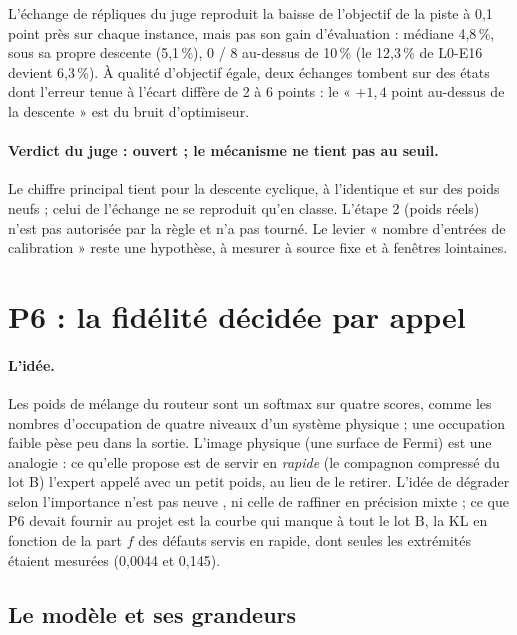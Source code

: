 L'échange de répliques du juge reproduit la baisse de l'objectif de la piste à 0,1 point près sur chaque instance, mais pas son gain d'évaluation : médiane 4,8\,\%, sous sa propre descente (5,1\,\%), 0 / 8 au-dessus de 10\,\% (le 12,3\,\% de L0-E16 devient 6,3\,\%). À qualité d'objectif égale, deux échanges tombent sur des états dont l'erreur tenue à l'écart diffère de 2 à 6 points : le « $+1{,}4$ point au-dessus de la descente » est du bruit d'optimiseur.

\paragraph{Verdict du juge : ouvert ; le mécanisme ne tient pas au seuil.} Le chiffre principal tient pour la descente cyclique, à l'identique et sur des poids neufs ; celui de l'échange ne se reproduit qu'en classe. L'étape 2 (poids réels) n'est pas autorisée par la règle et n'a pas tourné. Le levier « nombre d'entrées de calibration » reste une hypothèse, à mesurer à source fixe et à fenêtres lointaines.

\section{P6 : la fidélité décidée par appel}\label{t3mim:sec:p6}

\paragraph{L'idée.} Les poids de mélange du routeur sont un softmax sur quatre scores, comme les nombres d'occupation de quatre niveaux d'un système physique ; une occupation faible pèse peu dans la sortie. L'image physique (une surface de Fermi) est une analogie : ce qu'elle propose est de servir en \emph{rapide} (le compagnon compressé du lot B) l'expert appelé avec un petit poids, au lieu de le retirer. L'idée de dégrader selon l'importance n'est pas neuve \cite{hobbit2024,lu2024notallexperts}, ni celle de raffiner en précision mixte \cite{haidar2018mixed} ; ce que P6 devait fournir au projet est la courbe qui manque à tout le lot B, la KL en fonction de la part $f$ des défauts servis en rapide, dont seules les extrémités étaient mesurées (0,0044 et 0,145).

\subsection{Le modèle et ses grandeurs}\label{t3mim:sec:p6-modele}

